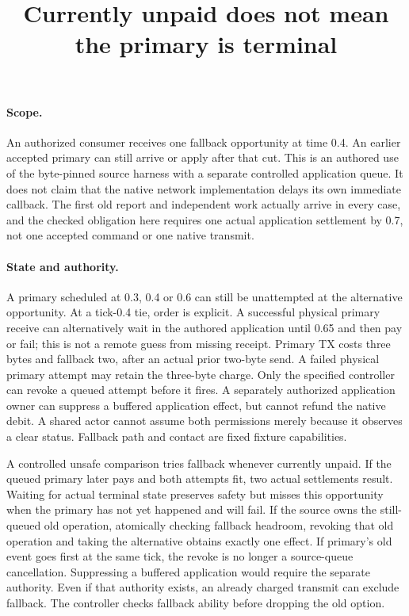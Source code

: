 \documentclass[11pt]{article}
\title{Currently unpaid does not mean the primary is terminal}
\date{}
\begin{document}
\maketitle

\paragraph{Scope.}
An authorized consumer receives one fallback opportunity at time 0.4.
An earlier accepted primary can still arrive or apply after that cut.
This is an authored use of the byte-pinned source harness with a
separate controlled application queue. It does not claim that the
native network implementation delays its own immediate callback.
The first old report and independent work actually arrive in every
case, and the checked obligation here requires one actual application
settlement by 0.7, not one accepted command or one native transmit.

\paragraph{State and authority.}
A primary scheduled at 0.3, 0.4 or 0.6 can still be unattempted
at the alternative opportunity. At a tick-0.4 tie, order is explicit.
A successful physical primary receive can alternatively wait in the
authored application until 0.65 and then pay or fail; this is not a
remote guess from missing receipt. Primary TX costs three bytes and
fallback two, after an actual prior two-byte send. A failed physical
primary attempt may retain the three-byte charge. Only the specified
controller can revoke a queued attempt before it fires. A separately
authorized application owner can suppress a buffered application
effect, but cannot refund the native debit. A shared actor cannot
assume both permissions merely because it observes a clear status.
Fallback path and contact are fixed fixture capabilities.

A controlled unsafe comparison tries fallback whenever currently
unpaid. If the queued primary later pays and both attempts fit,
two actual settlements result. Waiting for actual terminal state
preserves safety but misses this opportunity when the primary has
not yet happened and will fail. If the source owns the still-queued
old operation, atomically checking fallback headroom, revoking that
old operation and taking the alternative obtains exactly one effect.
If primary's old event goes first at the same tick, the revoke is
no longer a source-queue cancellation. Suppressing a buffered
application would require the separate authority. Even if that
authority exists, an already charged transmit can exclude fallback.
The controller checks fallback ability before dropping the old option.
\end{document}
